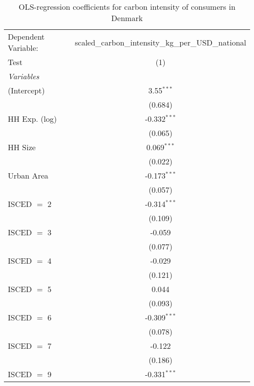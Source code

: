 
\begin{table}[htbp!]
   \centering
   \small
   \begin{adjustbox}{width = 1\textwidth, max height = 0.95\textheight, center}
      \begin{threeparttable}[b]
         \caption{\label{tab:OLS_1_DNK} OLS-regression coefficients for carbon intensity of consumers in Denmark}
         \begin{tabular}{lc}
            \tabularnewline \midrule \midrule
            Dependent Variable: & scaled\_carbon\_intensity\_kg\_per\_USD\_national\\        
            Test                & (1)\\  
            \midrule
            \emph{Variables}\\
            (Intercept)         & 3.55$^{***}$\\   
                                & (0.684)\\   
            HH Exp. (log)       & -0.332$^{***}$\\   
                                & (0.065)\\   
            HH Size             & 0.069$^{***}$\\   
                                & (0.022)\\   
            Urban Area          & -0.173$^{***}$\\   
                                & (0.057)\\   
            ISCED $=$ 2         & -0.314$^{***}$\\   
                                & (0.109)\\   
            ISCED $=$ 3         & -0.059\\   
                                & (0.077)\\   
            ISCED $=$ 4         & -0.029\\   
                                & (0.121)\\   
            ISCED $=$ 5         & 0.044\\   
                                & (0.093)\\   
            ISCED $=$ 6         & -0.309$^{***}$\\   
                                & (0.078)\\   
            ISCED $=$ 7         & -0.122\\   
                                & (0.186)\\   
            ISCED $=$ 9         & -0.331$^{***}$\\   

\end{tabular}
\end{threeparttable}
\end{adjustbox}
\end{table}
